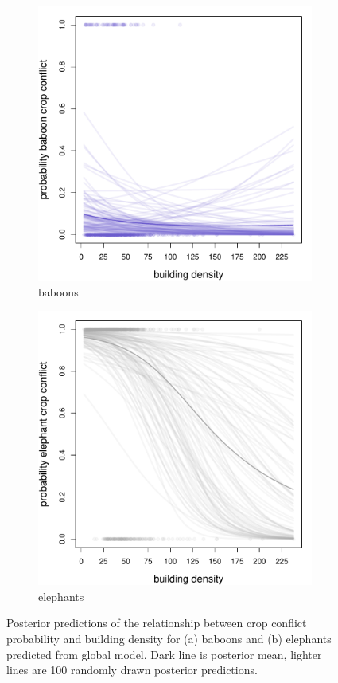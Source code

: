 \documentclass[12pt,]{article}
\begin{document}
\begin{figure}[H]
  \centering
	\begin{subfigure}[b]{0.49\textwidth}
	\includegraphics[width=\textwidth]{Figures/build_dens_crop_global_conflict_bab.pdf} 
    \caption{baboons}
   	    \label{fig:cropBDbab}
\end{subfigure}
\begin{subfigure}[b]{0.49\textwidth}
	\includegraphics[width=\textwidth]{Figures/build_dens_crop_global_conflict_ele.pdf}  
    \caption{elephants}
  	\label{fig:cropBDele}
\end{subfigure}
\caption{Posterior predictions of the relationship between crop conflict probability and building density for (a) baboons and (b) elephants predicted from global model. Dark line is posterior mean, lighter lines are 100 randomly drawn posterior predictions.}
\end{figure}
\end{document}

